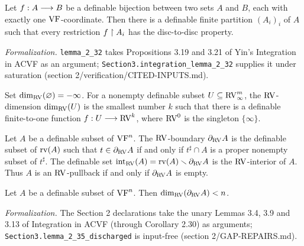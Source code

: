 \setcounter{theorem}{31}
\begin{lemma}
\label{open-pro}
\leanok
{}
Let $f : A \longrightarrow B$ be a definable bijection between two sets $A$ and $B$, each with exactly one $\mathrm{VF}$-coordinate. Then there is a definable finite partition $(A_i)_i$ of $A$ such that every restriction $f \upharpoonright A_i$ has the disc-to-disc property.

\emph{Formalization.} \texttt{lemma\_2\_32} takes Propositions 3.19 and 3.21 of Yin's Integration in ACVF as an argument; \texttt{Section3.integration\_lemma\_2\_32} supplies it under saturation (section 2/verification/CITED-INPUTS.md).
\end{lemma}

\setcounter{theorem}{32}
\begin{definition}[$\RV$-dimension]
\label{s2-rv-dimension}
\leanok
{}
Set $\dim_{\mathrm{RV}}(\varnothing) = -\infty$. For a nonempty definable subset $U \subseteq \mathrm{RV}_\infty^m$, the $\RV$-dimension $\dim_{\mathrm{RV}}(U)$ is the smallest number $k$ such that there is a definable finite-to-one function $f : U \longrightarrow \mathrm{RV}^k$, where $\mathrm{RV}^0$ is the singleton $\{\infty\}$.
\end{definition}

\setcounter{theorem}{33}
\begin{definition}
\label{s2-rv-boundary}
\leanok
{}
Let $A$ be a definable subset of $\mathrm{VF}^n$. The $\RV$-boundary $\partial_{\mathrm{RV}} A$ is the definable subset of $\operatorname{rv}(A)$ such that $t \in \partial_{\mathrm{RV}} A$ if and only if $t^\sharp \cap A$ is a proper nonempty subset of $t^\sharp$. The definable set $\operatorname{int}_{\mathrm{RV}}(A) = \operatorname{rv}(A) \smallsetminus \partial_{\mathrm{RV}} A$ is the $\RV$-interior of $A$. Thus $A$ is an $\RV$-pullback if and only if $\partial_{\mathrm{RV}} A$ is empty.
\end{definition}

\setcounter{theorem}{34}
\begin{lemma}
\label{RV-bou-dim}
\leanok
{}
Let $A$ be a definable subset of $\mathrm{VF}^n$. Then $\dim_{\mathrm{RV}}(\partial_{\mathrm{RV}} A) < n$.

\emph{Formalization.} The Section 2 declarations take the unary Lemmas 3.4, 3.9 and 3.13 of Integration in ACVF (through Corollary 2.30) as arguments; \texttt{Section3.lemma\_2\_35\_discharged} is input-free (section 2/GAP-REPAIRS.md).
\end{lemma}

